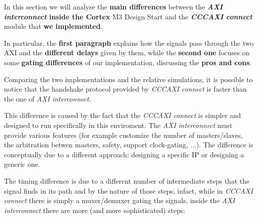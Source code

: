 In this section we will analyse the {\bf  main differences} between the {\bf  \textit{AXI interconnect} inside the Cortex} M3 Design Start and the {\bf \textit{CCCAXI connect}} module that {\bf we implemented}.
\newline

In particular, the {\bf first paragraph} explains how the signals pass through the two AXI and the {\bf different delays} given by them, while the {\bf second one} focuses on some {\bf gating differences} of our implementation, discussing the {\bf pros and cons}.
\newline

{}

Comparing the two implementations and the relative simulations, it is possible to notice that the handshake protocol provided by \textit{CCCAXI connect} is faster than the one of \textit{AXI interconnect}.
\newline

This difference is caused by the fact that the \textit{CCCAXI connect} is simpler and designed to run specifically in this enviroment. The \textit{AXI interconnect} must provide various features (for example customize the number of masters/slaves, the arbitration betwen masters, safety, support clock-gating, ...). The difference is conceptually due to a different approach: designing a specific IP or designing a generic one.
\newline

The timing difference is due to a different number of intermediate steps that the signal finds in its path and by the nature of those steps; infact, while in \textit{CCCAXI connect} there is simply a muxer/demuxer gating the signals, inside the \textit{AXI interconnect} there are more (and more sophisticated) steps:
\newline


